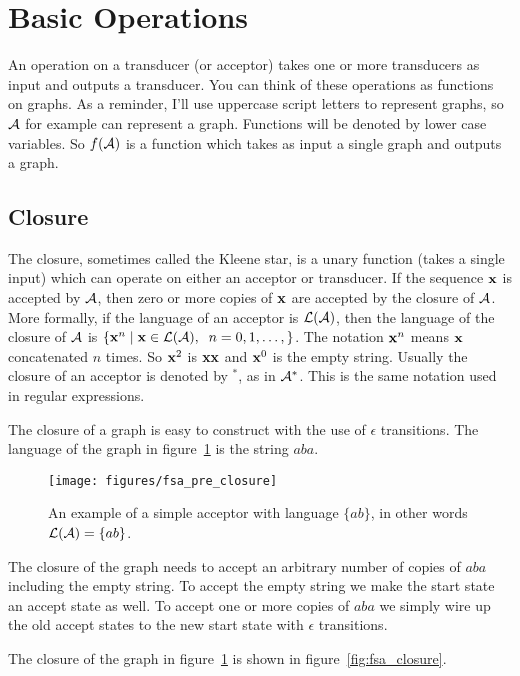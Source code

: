 \section{Basic Operations}
\label{sec:basic_operations}

An operation on a transducer (or acceptor) takes one or more transducers as
input and outputs a transducer. You can think of these operations as functions
on graphs. As a reminder, I'll use uppercase script letters to represent
graphs, so $\mathcal{A}$ for example can represent a graph. Functions will be denoted
by lower case variables. So $f(\mathcal{A})$ is a function which takes as input a
single graph and outputs a graph.

\subsection{Closure}

The closure, sometimes called the Kleene star, is a unary function (takes a
single input) which can operate on either an acceptor or transducer. If the
sequence ${\bf x}$ is accepted by $\mathcal{A}$, then zero or more copies of ${\bf x}$ are
accepted by the closure of $\mathcal{A}$. More formally, if the language of an acceptor
is $\mathcal{L}(\mathcal{A})$, then the language of the closure of $\mathcal{A}$ is $\{{\bf x}^n
\mid {\bf x} \in \mathcal{L}(\mathcal{A}),\;\; n = 0, 1, \ldots, \}$. The notation ${\bf x}^n$
means ${\bf x}$ concatenated $n$ times. So ${\bf x}^2$ is ${\bf x} {\bf x}$ and ${\bf x}^0$ is the
empty string. Usually the closure of an acceptor is denoted by $^*$, as in
$\mathcal{A}^*$. This is the same notation used in regular expressions.

The closure of a graph is easy to construct with the use of $\epsilon$
transitions. The language of the graph in figure~\ref{fig:fsa_pre_closure} is
the string $aba$.

\begin{figure}
    \centering
    \texttt{[image: figures/fsa\_pre\_closure]}
    \caption{An example of a simple acceptor with language $\{ab\}$, in other
    words $\mathcal{L}(\mathcal{A}) = \{ab\}$.}
    \label{fig:fsa_pre_closure}
\end{figure}

The closure of the graph needs to accept an arbitrary number of copies of $aba$
including the empty string. To accept the empty string we make the start state
an accept state as well. To accept one or more copies of $aba$ we simply wire
up the old accept states to the new start state with $\epsilon$ transitions.

The closure of the graph in figure~\ref{fig:fsa_pre_closure} is shown in
figure~\ref{fig:fsa_closure}.


